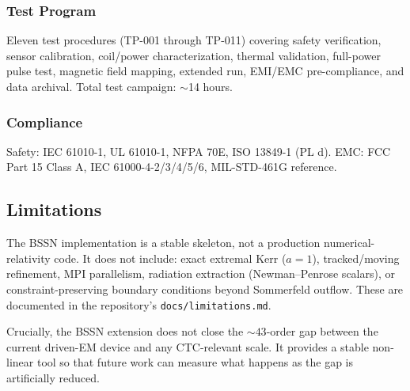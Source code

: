 \subsubsection{Test Program}

Eleven test procedures (TP-001 through TP-011) covering safety verification, sensor calibration, coil/power characterization, thermal validation, full-power pulse test, magnetic field mapping, extended run, EMI/EMC pre-compliance, and data archival. Total test campaign: $\sim$14 hours.

\subsubsection{Compliance}

Safety: IEC 61010-1, UL 61010-1, NFPA 70E, ISO 13849-1 (PL d). EMC: FCC Part 15 Class A, IEC 61000-4-2/3/4/5/6, MIL-STD-461G reference.

\subsection{Limitations}

The BSSN implementation is a stable skeleton, not a production
numerical-relativity code. It does not include: exact extremal Kerr
($a = 1$), tracked/moving refinement, MPI parallelism, radiation
extraction (Newman--Penrose scalars), or constraint-preserving
boundary conditions beyond Sommerfeld outflow. These are documented
in the repository's \texttt{docs/limitations.md}.

Crucially, the BSSN extension does not close the $\sim 43$-order gap
between the current driven-EM device and any CTC-relevant scale. It
provides a stable non-linear tool so that future work can measure
what happens as the gap is artificially reduced.
